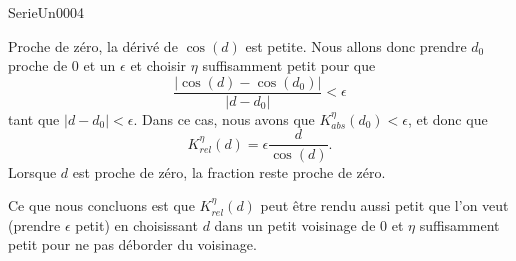 
\begin{corrige}{SerieUn0004}

	Proche de zéro, la dérivé de $\cos(d)$ est petite. Nous allons donc prendre $d_0$ proche de $0$ et un $\epsilon$ et choisir $\eta$ suffisamment petit pour que 
	\begin{equation}
		\frac{ | \cos(d)-\cos(d_0) | }{ | d-d_0 | }<\epsilon
	\end{equation}
	tant que $| d-d_0 |<\epsilon$. Dans ce cas, nous avons que $K^{\eta}_{abs}(d_0)<\epsilon$, et donc que 
	\begin{equation}
		K_{rel}^{\eta}(d)=\epsilon\frac{ d }{ \cos(d) }.
	\end{equation}
	Lorsque $d$ est proche de zéro, la fraction reste proche de zéro.

	Ce que nous concluons est que $K^{\eta}_{rel}(d)$ peut être rendu aussi petit que l'on veut (prendre $\epsilon$ petit) en choisissant $d$ dans un petit voisinage de $0$ et $\eta$ suffisamment petit pour ne pas déborder du voisinage.

\end{corrige}
